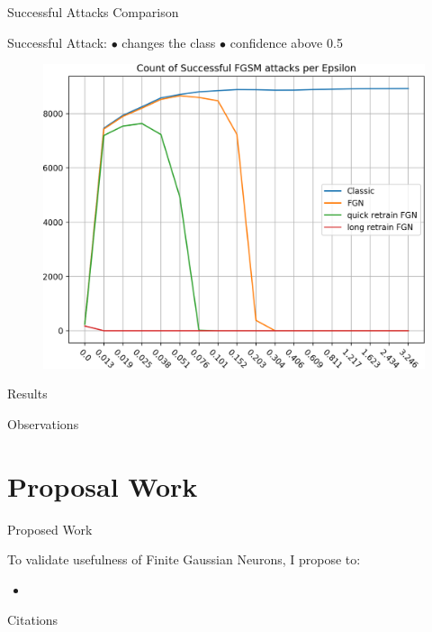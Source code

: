 \documentclass{beamer}
\begin{document}
\begin{frame}{Successful Attacks Comparison}
    \begin{block}{}
        Successful Attack: $\bullet$ changes the class $\bullet$ confidence above 0.5
    \end{block}
    \begin{figure}
        \centering
        \includegraphics[width=.88\textheight]{images/successful-attacks-comparisons/succesful_fgsm_count.png}
    \end{figure}
\end{frame}

\begin{frame}{Results}
\end{frame}
\begin{frame}{Observations}
\end{frame}
\section{Proposal Work}
\begin{frame}{Proposed Work}

    To validate usefulness of Finite Gaussian Neurons, I propose to:
    \begin{itemize}
        \item 
    \end{itemize}

\end{frame}

\begin{frame}{Citations}
    \printbibliography

\end{frame}
\end{document}
